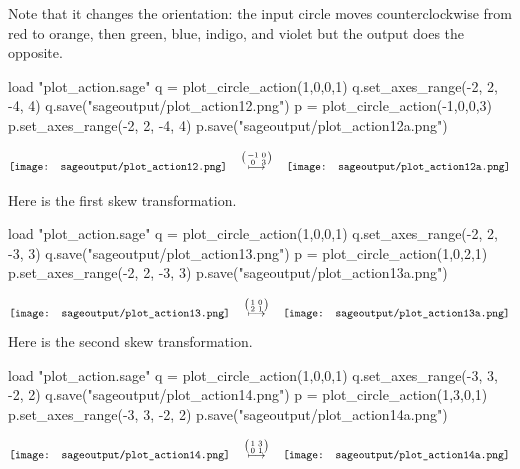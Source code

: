 Note that it changes the orientation: the input circle moves 
counterclockwise from red to orange, then green, blue, indigo, and violet
but the output does the opposite. 
\begin{sageoutput}[d,0,4;d,5,7]
load "plot_action.sage"
q = plot_circle_action(1,0,0,1) 
q.set_axes_range(-2, 2, -4, 4) 
q.save("sageoutput/plot_action12.png")
p = plot_circle_action(-1,0,0,3) 
p.set_axes_range(-2, 2, -4, 4) 
p.save("sageoutput/plot_action12a.png")
\end{sageoutput}
\begin{equation*}
  \vcenteredhbox{\texttt{[image: sageoutput/plot\_action12.png]}}
  \quad\mapsunder{\big (\begin{smallmatrix} -1 &0 \\ 0 &3 \end{smallmatrix}\big )}\quad
  \vcenteredhbox{\texttt{[image: sageoutput/plot\_action12a.png]}}
\end{equation*}

Here is the first skew
transformation. 
\begin{sageoutput}[d,0,4;d,5,7]
load "plot_action.sage"
q = plot_circle_action(1,0,0,1) 
q.set_axes_range(-2, 2, -3, 3) 
q.save("sageoutput/plot_action13.png")
p = plot_circle_action(1,0,2,1) 
p.set_axes_range(-2, 2, -3, 3) 
p.save("sageoutput/plot_action13a.png")
\end{sageoutput}
\begin{equation*}
  \vcenteredhbox{\texttt{[image: sageoutput/plot\_action13.png]}}
  \quad\mapsunder{\big (\begin{smallmatrix} 1 &0 \\ 2 &1 \end{smallmatrix}\big )}\quad
  \vcenteredhbox{\texttt{[image: sageoutput/plot\_action13a.png]}}
\end{equation*}
\noindent Here is the second skew
transformation. 
\begin{sageoutput}[d,0,4;d,5,7]
load "plot_action.sage"
q = plot_circle_action(1,0,0,1) 
q.set_axes_range(-3, 3, -2, 2) 
q.save("sageoutput/plot_action14.png")
p = plot_circle_action(1,3,0,1) 
p.set_axes_range(-3, 3, -2, 2) 
p.save("sageoutput/plot_action14a.png")
\end{sageoutput}
\begin{equation*}
  \vcenteredhbox{\texttt{[image: sageoutput/plot\_action14.png]}}
  \quad\mapsunder{\big (\begin{smallmatrix} 1 &3 \\ 0 &1 \end{smallmatrix}\big )}\quad
  \vcenteredhbox{\texttt{[image: sageoutput/plot\_action14a.png]}}
\end{equation*}

